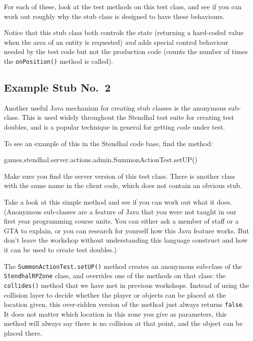 \documentclass[
]{book}
\newenvironment{Shaded}{\begin{snugshade}}{\end{snugshade}}
\newcommand{\FunctionTok}[1]{\textcolor[rgb]{0.00,0.00,0.00}{#1}}
\newcommand{\NormalTok}[1]{#1}
\begin{document}
For each of these, look at the test methods on this test class, and see if you can work out roughly why the stub class is designed to have these behaviours.

Notice that this stub class both controls the state (returning a hard-coded value when the area of an entity is requested) \emph{and} adds special control behaviour needed by the test code but not the production code (counts the number of times the \texttt{onPosition()} method is called).

\hypertarget{stubby2}{%
\subsection{Example Stub No.~2}\label{stubby2}}

Another useful Java mechanism for creating stub classes is the anonymous sub-class. This is used widely throughout the Stendhal test suite for creating test doubles, and is a popular technique in general for getting code under test.

To see an example of this in the Stendhal code base, find the method:

\begin{Shaded}
\begin{Highlighting}[]
\NormalTok{games.}\FunctionTok{stendhal}\NormalTok{.}\FunctionTok{server}\NormalTok{.}\FunctionTok{actions}\NormalTok{.}\FunctionTok{admin}\NormalTok{.}\FunctionTok{SummonActionTest}\NormalTok{.}\FunctionTok{setUP}\NormalTok{()}
\end{Highlighting}
\end{Shaded}

Make sure you find the server version of this test class. There is another class with the same name in the client code, which does not contain an obvious stub.

Take a look at this simple method and see if you can work out what it does. (Anonymous sub-classes are a feature of Java that you were not taught in our first year programming course units. You can either ask a member of staff or a GTA to explain, or you can research for yourself how this Java feature works. But don't leave the workshop without understanding this language construct and how it can be used to create test doubles.)

The \texttt{SummonActionTest.setUP()} method creates an anonymous sub-class of the \texttt{StendhalRPZone} class, and overrides one of the methods on that class: the \texttt{collides()} method that we have met in previous workshops. Instead of using the collision layer to decide whether the player or objects can be placed at the location given, this over-ridden version of the method just always returns \texttt{false}. It does not matter which location in this zone you give as parameters, this method will always say there is no collision at that point, and the object can be placed there.
\end{document}
